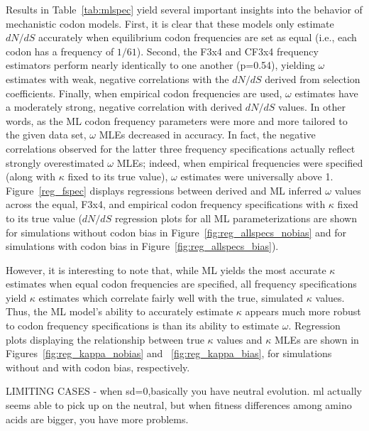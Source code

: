 \documentclass[11pt]{article}
\begin{document}
Results in Table~\ref{tab:mlspec} yield several important insights into the behavior of mechanistic codon models. First, it is clear that these models only estimate $dN/dS$ accurately when equilibrium codon frequencies are set as equal (i.e., each codon has a frequency of $1/61$). Second, the F3x4 and CF3x4 frequency estimators perform nearly identically to one another (p=0.54), yielding $\omega$ estimates with weak, negative correlations with the $dN/dS$ derived from selection coefficients. Finally, when empirical codon frequencies are used, $\omega$ estimates have a moderately strong, negative correlation with derived $dN/dS$ values. In other words, as the ML codon frequency parameters were more and more tailored to the given data set, $\omega$ MLEs decreased in accuracy. In fact, the negative correlations observed for the latter three frequency specifications actually reflect strongly overestimated $\omega$ MLEs; indeed, when empirical frequencies were specified (along with $\kappa$ fixed to its true value), $\omega$ estimates were universally above 1.  Figure~\ref{reg_fspec} displays regressions between derived and ML inferred $\omega$ values across the equal, F3x4, and empirical codon frequency specifications with $\kappa$ fixed to its true value ($dN/dS$ regression plots for all ML parameterizations are shown 
for simulations without codon bias in Figure~\ref{fig:reg_allspecs_nobias} and for simulations with codon bias in Figure~\ref{fig:reg_allspecs_bias}).

However, it is interesting to note that, while ML yields the most accurate $\kappa$ estimates when equal codon frequencies are specified, all frequency specifications yield $\kappa$ estimates which correlate fairly well with the true, simulated $\kappa$ values. Thus, the ML model's ability to accurately estimate $\kappa$ appears much more robust to codon frequency specifications is than its ability to estimate $\omega$. Regression plots displaying the relationship between true $\kappa$ values and $\kappa$ MLEs are shown in Figures~\ref{fig:reg_kappa_nobias} and ~\ref{fig:reg_kappa_bias}, for simulations without and with codon bias, respectively.


LIMITING CASES - when sd=0,basically you have neutral evolution. ml actually seems able to pick up on the neutral, but when fitness differences among amino acids are bigger, you have more problems.
\end{document}
